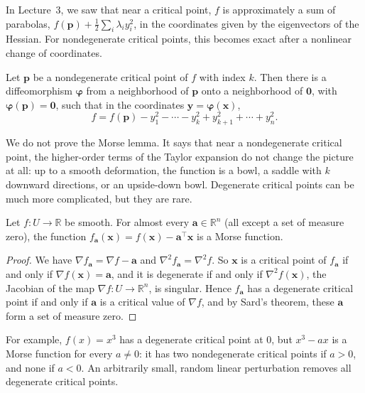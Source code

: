 In Lecture~3, we saw that near a critical point, $f$ is approximately a sum of parabolas, $f(\mathbf{p}) + \frac{1}{2}\sum_i \lambda_i y_i^2$, in the coordinates given by the eigenvectors of the Hessian. For nondegenerate critical points, this becomes exact after a nonlinear change of coordinates.

\begin{theorem}\label{A-thm:morse-lemma}
    Let $\mathbf{p}$ be a nondegenerate critical point of $f$ with index $k$. Then there is a diffeomorphism $\boldsymbol{\varphi}$ from a neighborhood of $\mathbf{p}$ onto a neighborhood of $\mathbf{0}$, with $\boldsymbol{\varphi}(\mathbf{p}) = \mathbf{0}$, such that in the coordinates $\mathbf{y} = \boldsymbol{\varphi}(\mathbf{x})$,
    \[f = f(\mathbf{p}) - y_1^2 - \cdots - y_k^2 + y_{k+1}^2 + \cdots + y_n^2.\]
\end{theorem}

We do not prove the Morse lemma. It says that near a nondegenerate critical point, the higher-order terms of the Taylor expansion do not change the picture at all: up to a smooth deformation, the function is a bowl, a saddle with $k$ downward directions, or an upside-down bowl. Degenerate critical points can be much more complicated, but they are rare.

\begin{theorem}\label{A-thm:morse-generic}
    Let $f: U \to \mathbb{R}$ be smooth. For almost every $\mathbf{a} \in \mathbb{R}^n$ (all except a set of measure zero), the function $f_{\mathbf{a}}(\mathbf{x}) = f(\mathbf{x}) - \mathbf{a}^\top\mathbf{x}$ is a Morse function.
\end{theorem}

\begin{proof}
    We have $\nabla f_{\mathbf{a}} = \nabla f - \mathbf{a}$ and $\nabla^2 f_{\mathbf{a}} = \nabla^2 f$. So $\mathbf{x}$ is a critical point of $f_{\mathbf{a}}$ if and only if $\nabla f(\mathbf{x}) = \mathbf{a}$, and it is degenerate if and only if $\nabla^2 f(\mathbf{x})$, the Jacobian of the map $\nabla f: U \to \mathbb{R}^n$, is singular. Hence $f_{\mathbf{a}}$ has a degenerate critical point if and only if $\mathbf{a}$ is a critical value of $\nabla f$, and by Sard's theorem, these $\mathbf{a}$ form a set of measure zero.
\end{proof}

For example, $f(x) = x^3$ has a degenerate critical point at $0$, but $x^3 - ax$ is a Morse function for every $a \neq 0$: it has two nondegenerate critical points if $a > 0$, and none if $a < 0$. An arbitrarily small, random linear perturbation removes all degenerate critical points.

